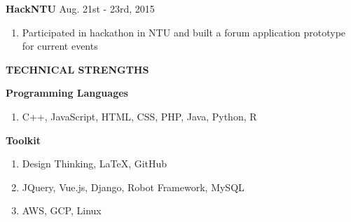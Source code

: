 \documentclass[12pt]{article}
\begin{document}
	\vspace{0.5em}

	\textbf{HackNTU} \hfill{Aug. 21st - 23rd, 2015}

	\begin{enumerate}

		\item Participated in hackathon in NTU and built a forum application prototype for current events

	\end{enumerate}

	\vspace{1em}

\textbf{\large{\uppercase{Technical Strengths}}}
\hrulefill{}

	\textbf{Programming Languages}

	\begin{enumerate}

		\item C++, JavaScript, HTML, CSS, PHP, Java, Python, R

	\end{enumerate}

	\vspace{0.5em}

	\textbf{Toolkit}

	\begin{enumerate}

		\item Design Thinking, LaTeX, GitHub

		\item JQuery, Vue.js, Django, Robot Framework, MySQL

		\item AWS, GCP, Linux

	\end{enumerate}
\end{document}
